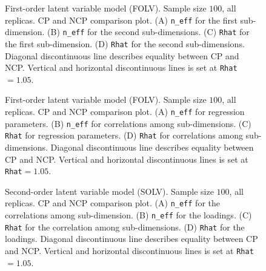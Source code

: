 %
\begin{figure}[H]
	\centering
	\begin{subfigure}
		\texttt{[image: FOLV\_100\_neff3]}
	\end{subfigure}
	\begin{subfigure}
		\texttt{[image: FOLV\_100\_Rhat3]}
	\end{subfigure}
	\caption[First-order latent variable model (FOLV). Sample size $100$, all replicas. CP and NCP comparison plot.]%
	{First-order latent variable model (FOLV). Sample size $100$, all replicas. CP and NCP comparison plot. (A) \texttt{n\_eff} for the first sub-dimension. (B) \texttt{n\_eff} for the second sub-dimensions. (C) \texttt{Rhat} for the first sub-dimension. (D) \texttt{Rhat} for the second sub-dimensions. Diagonal discontinuous line describes equality between CP and NCP. Vertical and horizontal discontinuous lines is set at \texttt{Rhat}$=1.05$. }
	\label{fig:FOLV_stat3}
\end{figure}
%
\begin{figure}[H]
	\centering
	\begin{subfigure}
		\texttt{[image: FOLV\_100\_neff2]}
	\end{subfigure}
	\begin{subfigure}
		\texttt{[image: FOLV\_100\_Rhat2]}
	\end{subfigure}
	\caption[First-order latent variable model (FOLV). Sample size $100$, all replicas. CP and NCP comparison plot.]%
	{First-order latent variable model (FOLV). Sample size $100$, all replicas. CP and NCP comparison plot. (A) \texttt{n\_eff} for regression parameters. (B) \texttt{n\_eff} for correlations among sub-dimensions. (C) \texttt{Rhat} for regression parameters. (D) \texttt{Rhat} for correlations among sub-dimensions. Diagonal discontinuous line describes equality between CP and NCP. Vertical and horizontal discontinuous lines is set at \texttt{Rhat}$=1.05$. }
	\label{fig:FOLV_stat2}
\end{figure}
%
\begin{figure}[H]
	\centering
	\begin{subfigure}
		\texttt{[image: SOLV\_100\_neff3]}
	\end{subfigure}
	\begin{subfigure}
		\texttt{[image: SOLV\_100\_Rhat3]}
	\end{subfigure}
	\caption[Second-order latent variable model (SOLV). Sample size $100$, all replicas. CP and NCP comparison plot.]%
	{Second-order latent variable model (SOLV). Sample size $100$, all replicas. CP and NCP comparison plot. (A) \texttt{n\_eff} for the correlations among sub-dimension. (B) \texttt{n\_eff} for the loadings. (C) \texttt{Rhat} for the correlation among sub-dimensions. (D) \texttt{Rhat} for the loadings. Diagonal discontinuous line describes equality between CP and NCP. Vertical and horizontal discontinuous lines is set at \texttt{Rhat}$=1.05$. }
	\label{fig:SOLV_stat1}
\end{figure}
